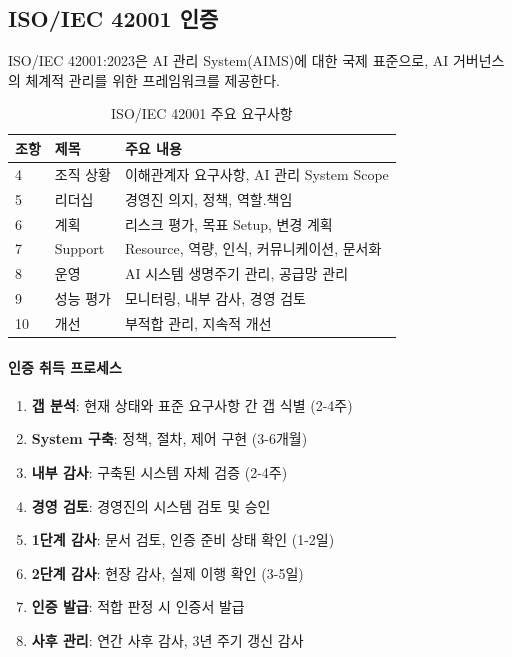 \subsection{ISO/IEC 42001 인증}
\label{sec:11.3.2}

ISO/IEC 42001:2023은 AI 관리 System(AIMS)에 대한 국제 표준으로, 
AI 거버넌스의 체계적 관리를 위한 프레임워크를 제공한다.

\begin{table}[htbp]
\centering
\caption{ISO/IEC 42001 주요 요구사항}
\label{tab:iso42001_requirements_audit}
\begin{tabularx}{\textwidth}{p{2cm}p{3cm}X}
\toprule
\textbf{조항} & \textbf{제목} & \textbf{주요 내용} \\
\midrule
4 & 
조직 상황 & 
이해관계자 요구사항, AI 관리 System Scope \\
\midrule
5 & 
리더십 & 
경영진 의지, 정책, 역할.책임 \\
\midrule
6 & 
계획 & 
리스크 평가, 목표 Setup, 변경 계획 \\
\midrule
7 & 
Support & 
Resource, 역량, 인식, 커뮤니케이션, 문서화 \\
\midrule
8 & 
운영 & 
AI 시스템 생명주기 관리, 공급망 관리 \\
\midrule
9 & 
성능 평가 & 
모니터링, 내부 감사, 경영 검토 \\
\midrule
10 & 
개선 & 
부적합 관리, 지속적 개선 \\
\bottomrule
\end{tabularx}
\end{table}


\paragraph{인증 취득 프로세스}

\begin{enumerate}
 \item \textbf{갭 분석}: 현재 상태와 표준 요구사항 간 갭 식별 (2-4주)
 \item \textbf{System 구축}: 정책, 절차, 제어 구현 (3-6개월)
 \item \textbf{내부 감사}: 구축된 시스템 자체 검증 (2-4주)
 \item \textbf{경영 검토}: 경영진의 시스템 검토 및 승인
 \item \textbf{1단계 감사}: 문서 검토, 인증 준비 상태 확인 (1-2일)
 \item \textbf{2단계 감사}: 현장 감사, 실제 이행 확인 (3-5일)
 \item \textbf{인증 발급}: 적합 판정 시 인증서 발급
 \item \textbf{사후 관리}: 연간 사후 감사, 3년 주기 갱신 감사
\end{enumerate}


